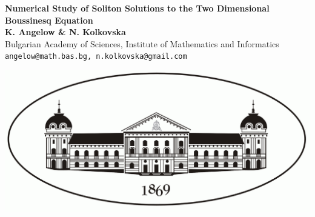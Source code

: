 \documentclass[a0,portrait]{a0poster}
\begin{document}
\newcommand{\rf}[1]{(\ref{#1})}
\newcommand{\RR}{\mathbb{R}}



\begin{minipage}[b]{0.75\linewidth}
\veryHuge \color{NavyBlue} \textbf{Numerical Study of Soliton Solutions to the Two Dimensional Boussinesq  Equation} \color{Black}\\ %
\huge \textbf{K. Angelow \& N. Kolkovska}\\[0.5cm] %
\huge Bulgarian Academy of Sciences, Institute of Mathematics and Informatics\\[0.4cm] %
\Large \texttt{angelow@math.bas.bg, n.kolkovska@gmail.com}\\
\end{minipage}
%
\begin{minipage}[b]{0.25\linewidth}
\includegraphics[width=20cm]{Logo_Bulgaria.png}\\
\end{minipage}

\vspace{1cm} %

\end{document}
